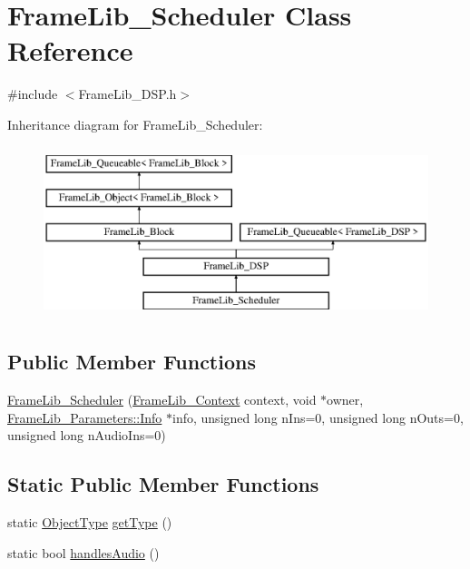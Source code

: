 \hypertarget{class_frame_lib___scheduler}{}\section{Frame\+Lib\+\_\+\+Scheduler Class Reference}
\label{class_frame_lib___scheduler}


{\ttfamily \#include $<$Frame\+Lib\+\_\+\+D\+S\+P.\+h$>$}

Inheritance diagram for Frame\+Lib\+\_\+\+Scheduler\+:\begin{figure}[H]
\begin{center}
\leavevmode
\includegraphics[height=5.000000cm]{class_frame_lib___scheduler}
\end{center}
\end{figure}
\subsection*{Public Member Functions}
\begin{DoxyCompactItemize}
\item 
\hyperlink{class_frame_lib___scheduler_adf967edcf371c60833c9c4dfb0daff1a}{Frame\+Lib\+\_\+\+Scheduler} (\hyperlink{class_frame_lib___context}{Frame\+Lib\+\_\+\+Context} context, void $\ast$owner, \hyperlink{class_frame_lib___parameters_1_1_info}{Frame\+Lib\+\_\+\+Parameters\+::\+Info} $\ast$info, unsigned long n\+Ins=0, unsigned long n\+Outs=0, unsigned long n\+Audio\+Ins=0)
\end{DoxyCompactItemize}
\subsection*{Static Public Member Functions}
\begin{DoxyCompactItemize}
\item 
static \hyperlink{_frame_lib___types_8h_a842c5e2e69277690b064bf363c017980}{Object\+Type} \hyperlink{class_frame_lib___scheduler_a7d93c185e4d7b2d13852dad251dc769b}{get\+Type} ()
\item 
static bool \hyperlink{class_frame_lib___scheduler_a6ab661f5a92b9cc0096af2cde6c6f513}{handles\+Audio} ()
\end{DoxyCompactItemize}
